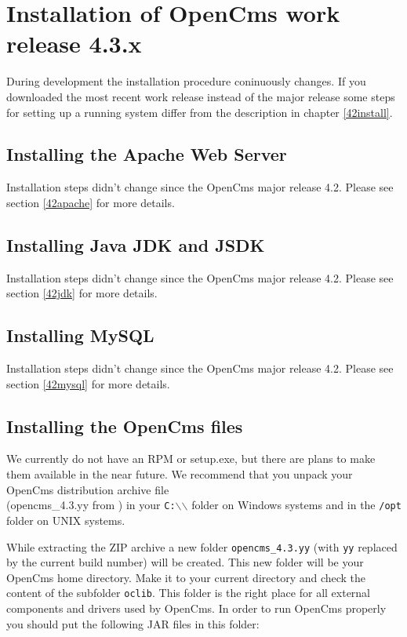\chapter{Installation of OpenCms work release 4.3.x}
During development the installation procedure coninuously
changes. If you downloaded the most recent work release
instead of the major release some steps for setting up a running
system differ from the description in chapter \ref{42install}.

\section{Installing the Apache Web Server}

Installation steps didn't change since the OpenCms major release 4.2. Please
see section \ref{42apache} for more details.

\section{Installing Java JDK and JSDK}

Installation steps didn't change since the OpenCms major release 4.2. Please
see section \ref{42jdk} for more details.

\section{Installing MySQL}

Installation steps didn't change since the OpenCms major release 4.2. Please
see section \ref{42mysql} for more details.

\section{Installing the OpenCms files}
We currently do not have an RPM or setup.exe, 
but there are plans to make them available in the near future.
We recommend that you unpack your OpenCms distribution archive file\\ 
(opencms\_4.3.yy from 
)
in your \texttt{C:$\backslash$$\backslash$} folder on Windows systems and 
in the \texttt{/opt} folder on UNIX systems. 

While extracting the ZIP archive
a new folder \texttt{opencms\_4.3.yy} (with \texttt{yy}
replaced by the current build number) will be created. This new folder will be your OpenCms home
directory. Make it to your current directory and check the content of
the subfolder \texttt{oclib}. This folder is the right place for all external
components and drivers used by OpenCms. In order to run OpenCms properly
you should put the following JAR files in this folder:

